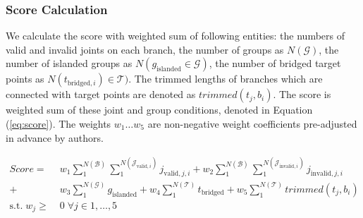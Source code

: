 \subsubsection{Score Calculation}
We calculate the score with weighted sum of following entities: the numbers of valid and invalid joints on each branch, the number of groups as $N(\mathcal{G} )$, the number of islanded groups as $N(g_{\text{islanded}} \in \mathcal{G} )$, the number of bridged target points as $N(t_{\text{bridged}, i}) \in \mathcal{T} )$.
The trimmed lengths of branches which are connected with target points are denoted as $trimmed(t_j, b_i)$.
The score is weighted sum of these joint and group conditions, denoted in Equation (\ref{eq:score}).
The weights $w_1 \dotso  w_5$ are non-negative weight coefficients pre-adjusted in advance by authors.


\begin{equation} 
 \begin{aligned}
 Score =  &\; w_1  \sum_{1}^{N(\mathcal{B})} \sum_{1}^{N(\mathcal{J}_{\text{valid},i})} j_{\text{valid}, j, i}
 + w_2  \sum_{1}^{N(\mathcal{B})} \sum_{1}^{N(\mathcal{J}_{\text{invalid},i})} j_{\text{invalid}, j, i}\\
+ &\; w_3  \sum_{1}^{N(\mathcal{G})} g_{\text{islanded}}
	 + w_4  \sum_{1}^{N(\mathcal{T})} t_{\text{bridged}}
+  w_5 \sum_{1}^{N(\mathcal{T})} trimmed(t_j, b_i)
 \\
   \textrm{s.t.} \; w_j  \geq  &\;0 \; \forall j \in 1, \dotsc , 5
 \end{aligned}
 \label{eq:score}
\end{equation}
